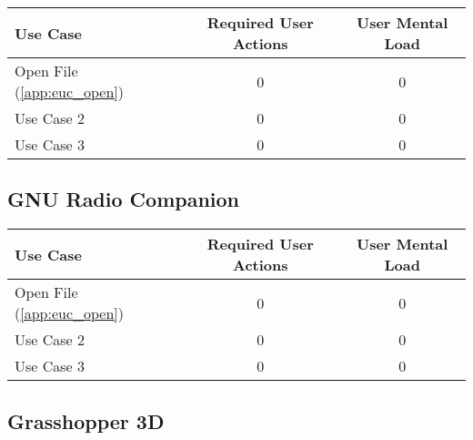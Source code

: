 \begin{tabularx}{\textwidth}{Xcc}
\textbf{Use Case} & \textbf{Required User Actions} & \textbf{User Mental Load}\\
\hline
Open File (\ref{app:euc_open}) & 0 & 0 \\
Use Case 2                     & 0 & 0 \\
Use Case 3                     & 0 & 0
\end{tabularx}

\subsection*{GNU Radio Companion}

\begin{tabularx}{\textwidth}{Xcc}
\textbf{Use Case} & \textbf{Required User Actions} & \textbf{User Mental Load}\\
\hline
Open File (\ref{app:euc_open}) & 0 & 0 \\
Use Case 2                     & 0 & 0 \\
Use Case 3                     & 0 & 0
\end{tabularx}

\subsection*{Grasshopper 3D}




